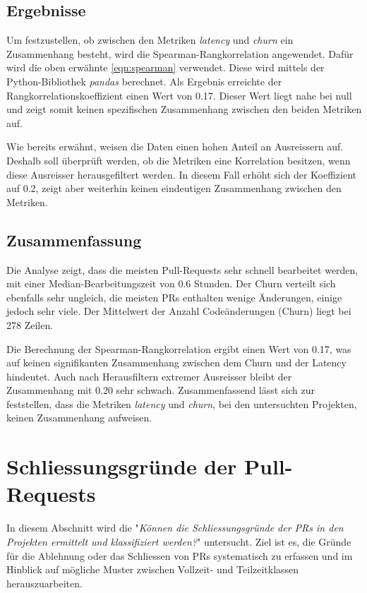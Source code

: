 \subsection{Ergebnisse}
Um festzustellen, ob zwischen den Metriken \textit{latency} und \textit{churn} ein Zusammenhang besteht, wird die Spearman-Rangkorrelation angewendet. Dafür wird die oben erwähnte \autoref{eqn:spearman} verwendet. Diese wird mittels der Python-Bibliothek \textit{pandas} berechnet. Als Ergebnis erreichte der Rangkorrelationskoeffizient einen Wert von 0.17. Dieser Wert liegt nahe bei null und zeigt somit keinen spezifischen Zusammenhang zwischen den beiden Metriken auf. 

Wie bereits erwähnt, weisen die Daten einen hohen Anteil an Ausreissern auf. Deshalb soll überprüft werden, ob die Metriken eine Korrelation besitzen, wenn diese Ausreisser herausgefiltert werden. In diesem Fall erhöht sich der Koeffizient auf 0.2, zeigt aber weiterhin keinen eindeutigen Zusammenhang zwischen den Metriken.

\subsection{Zusammenfassung}
Die Analyse zeigt, dass die meisten Pull-Requests sehr schnell bearbeitet werden, mit einer Median-Bearbeitungszeit von 0.6 Stunden. Der Churn verteilt sich ebenfalls sehr ungleich, die meisten PRs enthalten wenige Änderungen, einige jedoch sehr viele. Der Mittelwert der Anzahl Codeänderungen (Churn) liegt bei 278 Zeilen.

Die Berechnung der Spearman-Rangkorrelation ergibt einen Wert von 0.17, was auf keinen signifikanten Zusammenhang zwischen dem Churn und der Latency hindeutet. Auch nach Herausfiltern extremer Ausreisser bleibt der Zusammenhang mit 0.20 sehr schwach.
Zusammenfassend lässt sich zur  feststellen, dass die Metriken \textit{latency} und \textit{churn}, bei den untersuchten Projekten, keinen Zusammenhang aufweisen.

\section{Schliessungsgründe der Pull-Requests}
\label{sec:UntersuchungSchliessgründePRs} 
In diesem Abschnitt wird die  "\textit{Können die Schliessungsgründe der PRs in den Projekten ermittelt und klassifiziert werden?}" untersucht. Ziel ist es, die Gründe für die Ablehnung oder das Schliessen von PRs systematisch zu erfassen und im Hinblick auf  mögliche Muster zwischen Vollzeit- und Teilzeitklassen herauszuarbeiten.

